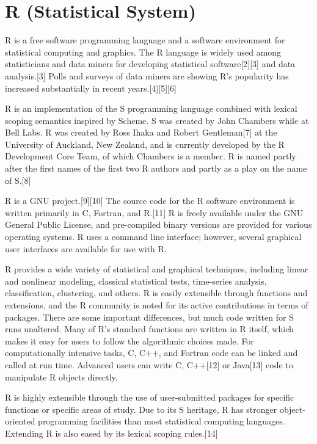 \newpage
\section{R (Statistical System)}

R is a free software programming language and a software environment for statistical computing and graphics. The R language is widely used among statisticians and data miners for developing statistical software[2][3] and data analysis.[3] Polls and surveys of data miners are showing R's popularity has increased substantially in recent years.[4][5][6]

\vpara
R is an implementation of the S programming language combined with lexical scoping semantics inspired by Scheme. S was created by John Chambers while at Bell Labs. R was created by Ross Ihaka and Robert Gentleman[7] at the University of Auckland, New Zealand, and is currently developed by the R Development Core Team, of which Chambers is a member. R is named partly after the first names of the first two R authors and partly as a play on the name of S.[8]

\vpara
R is a GNU project.[9][10] The source code for the R software environment is written primarily in C, Fortran, and R.[11] R is freely available under the GNU General Public License, and pre-compiled binary versions are provided for various operating systems. R uses a command line interface; however, several graphical user interfaces are available for use with R.

\vpara
R provides a wide variety of statistical and graphical techniques, including linear and nonlinear modeling, classical statistical tests, time-series analysis, classification, clustering, and others. R is easily extensible through functions and extensions, and the R community is noted for its active contributions in terms of packages. There are some important differences, but much code written for S runs unaltered. Many of R's standard functions are written in R itself, which makes it easy for users to follow the algorithmic choices made. For computationally intensive tasks, C, C++, and Fortran code can be linked and called at run time. Advanced users can write C, C++[12] or Java[13] code to manipulate R objects directly.

\vpara
R is highly extensible through the use of user-submitted packages for specific functions or specific areas of study. Due to its S heritage, R has stronger object-oriented programming facilities than most statistical computing languages. Extending R is also eased by its lexical scoping rules.[14]

